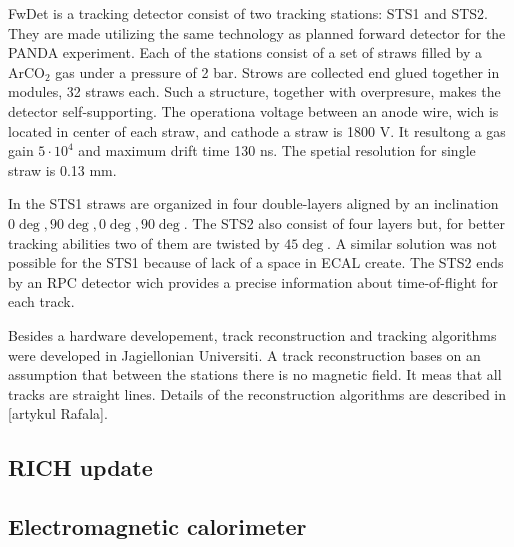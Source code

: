 FwDet is a tracking detector consist of two tracking stations: STS1 and STS2. They are made utilizing the same technology as planned forward detector for the PANDA experiment. Each of the stations consist of a set of straws filled by a ArCO$_2$ gas under a pressure of 2 bar. Strows are collected end glued together in modules, 32 straws each. Such a structure, together with overpresure, makes the detector self-supporting. The operationa voltage between an anode wire, wich is located in center of each straw, and cathode a straw is 1800 V. It resultong a gas gain $5 \cdot 10^4$ and maximum drift time 130 ns. The spetial resolution for single straw is 0.13 mm.

In the STS1 straws are organized in four double-layers aligned by an inclination $0\deg, 90\deg, 0\deg, 90\deg$. The STS2 also consist of four layers but, for better tracking abilities two of them are twisted by $45\deg$. A similar solution was not possible for the STS1 because of lack of a space in ECAL create. The STS2 ends by an RPC detector wich provides a precise information about time-of-flight for each track.

Besides a hardware developement, track reconstruction and tracking algorithms were developed in Jagiellonian Universiti. A track reconstruction bases on an assumption that between the stations there is no magnetic field. It meas that all tracks are straight lines. Details of the reconstruction algorithms are described in [artykul Rafala]. 
\subsection{RICH update}

\subsection{Electromagnetic calorimeter}

